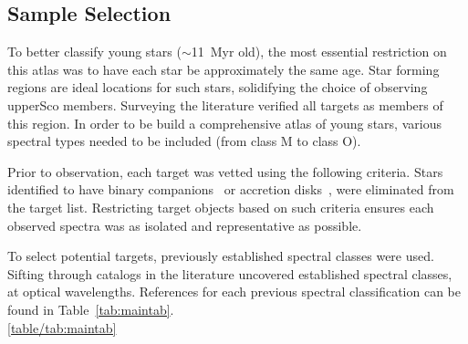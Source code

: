 \subsection{Sample Selection}


To better classify young stars ($\sim$11~Myr old), 
the most essential restriction on this atlas was to 
have each star be approximately the same age. 
Star forming regions are ideal locations for such stars, 
solidifying the choice of observing upperSco members.  
Surveying the literature verified all targets as members of this 
region.  In order to be build a comprehensive atlas of young 
stars, various spectral types needed to be included 
(from class M to class O).




Prior to observation, each target was vetted using the following criteria. 
Stars identified to have binary companions~\cite{binary_guy} or accretion 
disks~\cite{binary_guy}, were eliminated from the target list.  
Restricting target objects based on such criteria ensures each observed 
spectra was as isolated and representative as possible.



To select potential targets, previously established spectral classes 
were used.  
Sifting through catalogs in the literature uncovered established 
spectral classes, at optical wavelengths.    
References for each previous spectral classification 
can be found in Table~\ref{tab:maintab}.\\
\ref{table/tab:maintab}











